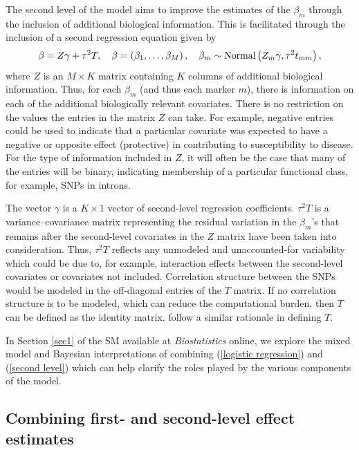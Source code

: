 \documentclass[oupdraft]{bio}
\begin{document}
The second level of the model aims to improve the estimates
of the $\beta_m$ through the inclusion of additional biological
information. This is facilitated through the inclusion of
a second regression equation given by
\begin{equation}
\beta = Z \gamma + \tau^2 T,
\quad
\beta = \left( \beta_1, \ldots, \beta_M \right),
\quad
\beta_m \sim \hbox{Normal} \left( Z_m \gamma, \tau^2 t_{mm} \right),
\label{second level}
\end{equation}
where $Z$ is an $M \times K$ matrix containing $K$ columns of
additional biological information. Thus, for each $\beta_m$
(and thus each marker $m$), there is information on each of
the additional biologically relevant covariates. There is no
restriction on the values the entries in the matrix $Z$ can
take. For example, negative entries could be used to indicate
that a particular covariate was expected to have a negative
or opposite effect (protective) in contributing to
susceptibility to disease. For the type of information
included in $Z$, it will often be the case that many of the
entries will be binary, indicating membership of a particular
functional class, for example, SNPs in introns.

The vector $\gamma$ is a $K \times 1$ vector of second-level
regression coefficients. $\tau^2 T$ is a variance--covariance
matrix representing the residual variation in the $\beta_m$'s
that remains after the second-level covariates in the $Z$ matrix
have been taken into consideration. Thus, $\tau^2 T$ reflects
any unmodeled and unaccounted-for variability which could be due
to, for example, interaction effects between the second-level
covariates or covariates not included. Correlation structure
between the SNPs would be modeled in the off-diagonal entries of
the $T$ matrix. If no correlation structure is to be modeled,
which can reduce the computational burden, then $T$ can be
defined as the identity matrix.
\citet{tomlins2005}
follow a similar rationale in defining $T$.

In Section \ref{sec1} of the SM available at
\textit{Biostatistics} online, we explore the mixed model
and Bayesian interpretations of combining (\ref{logistic regression})
and (\ref{second level}) which can help clarify the roles played by
the various components of the model.


\subsection{Combining first- and second-level effect estimates}
\end{document}
